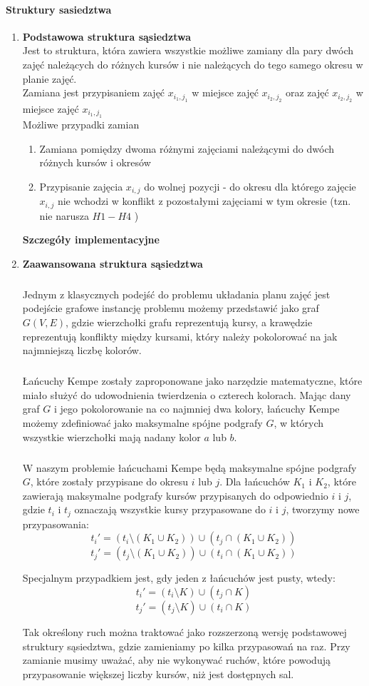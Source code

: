 \documentclass[11pt]{report}
\begin{document}
\paragraph{Struktury sasiedztwa}
\begin{enumerate}
\item \textbf{Podstawowa struktura sąsiedztwa} \\
Jest to struktura, która zawiera wszystkie możliwe zamiany dla pary dwóch zajęć należących do różnych kursów i nie należących do tego samego okresu w planie zajęć. \\
Zamiana jest przypisaniem zajęć $x_{i_{1},j_{1}}$ w miejsce zajęć ${x_{i_{2}, j_{2}}}$ oraz zajęć ${x_{i_{2}, j_{2}}}$ w miejsce zajęć $x_{i_{1},j_{1}}$ \\
Możliwe przypadki zamian
\begin{enumerate}
\item Zamiana pomiędzy dwoma różnymi zajęciami należącymi do dwóch różnych kursów i okresów
\item Przypisanie zajęcia ${x_{i,j}}$ do wolnej pozycji - do okresu dla którego zajęcie ${x_{i,j}}$ nie wchodzi w konflikt z pozostałymi zajęciami w tym okresie (tzn. nie narusza ${H1-H4}$ )
\end{enumerate}
\textbf{Szczegóły implementacyjne}


\item \textbf{Zaawansowana struktura sąsiedztwa} 
\subparagraph{}
Jednym z klasycznych podejść do problemu układania planu zajęć jest podejście grafowe instancję problemu możemy przedstawić jako graf $G(V, E)$, gdzie wierzchołki grafu reprezentują kursy, a krawędzie reprezentują konflikty między kursami, który należy pokolorować na jak najmniejszą liczbę kolorów. 
\subparagraph{}Łańcuchy Kempe zostały zaproponowane jako narzędzie matematyczne, które miało służyć do udowodnienia twierdzenia o czterech kolorach. Mając dany graf $G$ i jego pokolorowanie na co najmniej dwa kolory, łańcuchy Kempe możemy zdefiniować jako maksymalne spójne podgrafy $G$, w których wszystkie wierzchołki mają nadany kolor $a$ lub $b$.
\subparagraph{}W naszym problemie łańcuchami Kempe będą maksymalne spójne podgrafy $G$, które zostały przypisane do okresu $i$ lub $j$. Dla łańcuchów $K_1$ i $K_2$, które zawierają maksymalne podgrafy kursów przypisanych do odpowiednio $i$ i $j$, gdzie $t_i$ i $t_j$ oznaczają wszystkie kursy przypasowane do $i$ i $j$, tworzymy nowe przypasowania:
\[ t_i' = (t_i \setminus  (K_1 \cup K_2)) \cup (t_j \cap (K_1 \cup K_2)) \]
\[ t_j' = (t_j \setminus  (K_1 \cup K_2)) \cup (t_i \cap (K_1 \cup K_2)) \]

Specjalnym przypadkiem jest, gdy jeden z łańcuchów jest pusty, wtedy:
\[ t_i' = (t_i \setminus K) \cup (t_j \cap K)\]
\[ t_j' = (t_j \setminus K) \cup (t_i \cap K)\]

Tak określony ruch można traktować jako rozszerzoną wersję podstawowej struktury sąsiedztwa, gdzie zamieniamy po kilka przypasowań na raz. Przy zamianie musimy uważać, aby nie wykonywać ruchów, które powodują przypasowanie większej liczby kursów, niż jest dostępnych sal. 


\end{enumerate}
\end{document}
